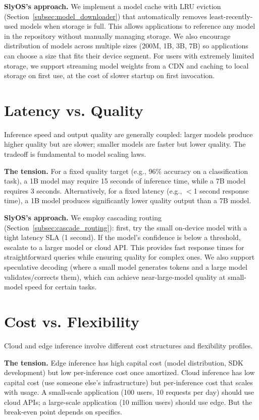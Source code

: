 \documentclass[12pt, letterpaper, twoside]{report}
\begin{document}
\textbf{SlyOS's approach.} We implement a model cache with LRU eviction (Section~\ref{subsec:model_downloader}) that automatically removes least-recently-used models when storage is full. This allows applications to reference any model in the repository without manually managing storage. We also encourage distribution of models across multiple sizes (200M, 1B, 3B, 7B) so applications can choose a size that fits their device segment. For users with extremely limited storage, we support streaming model weights from a CDN and caching to local storage on first use, at the cost of slower startup on first invocation.

\section{Latency vs. Quality}
\label{sec:latency_quality}

Inference speed and output quality are generally coupled: larger models produce higher quality but are slower; smaller models are faster but lower quality. The tradeoff is fundamental to model scaling laws.

\textbf{The tension.} For a fixed quality target (e.g., 96\% accuracy on a classification task), a 1B model may require 15 seconds of inference time, while a 7B model requires 3 seconds. Alternatively, for a fixed latency (e.g., $<$1 second response time), a 1B model produces significantly lower quality output than a 7B model.

\textbf{SlyOS's approach.} We employ cascading routing (Section~\ref{subsec:cascade_routing}): first, try the small on-device model with a tight latency SLA (1 second). If the model's confidence is below a threshold, escalate to a larger model or cloud API. This provides fast response times for straightforward queries while ensuring quality for complex ones. We also support speculative decoding (where a small model generates tokens and a large model validates/corrects them), which can achieve near-large-model quality at small-model speed for certain tasks.

\section{Cost vs. Flexibility}
\label{sec:cost_flexibility}

Cloud and edge inference involve different cost structures and flexibility profiles.

\textbf{The tension.} Edge inference has high capital cost (model distribution, SDK development) but low per-inference cost once amortized. Cloud inference has low capital cost (use someone else's infrastructure) but per-inference cost that scales with usage. A small-scale application (100 users, 10 requests per day) should use cloud APIs; a large-scale application (10 million users) should use edge. But the break-even point depends on specifics.
\end{document}

